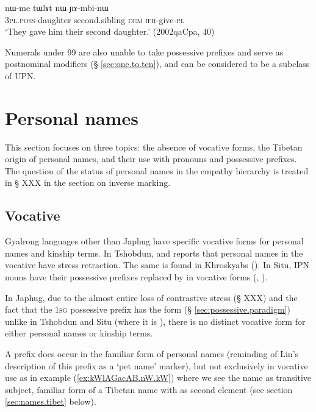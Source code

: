 \begin{exe}
\ex \label{ex:tWlAt}
\gll  nɯ-me tɯlɤt nɯ ɲɤ-mbi-nɯ \\
\textsc{3pl.poss}-daughter second.sibling \textsc{dem} \textsc{ifr}-give-\textsc{pl} \\
\glt `They gave him their second daughter.' (2002qaCpa, 40)
\end{exe} 

Numerals under 99 are also unable to take possessive prefixes and serve as postnominal modifiers (§ \ref{sec:one.to.ten}), and can be considered to be a subclass of UPN.

\section{Personal names}  \label{sec:personal.names}
This section focuses on three topics: the absence of vocative forms, the Tibetan origin of personal names, and their use with pronouns and possessive prefixes. The question of the status of personal names in the empathy hierarchy is treated in § XXX in the section on inverse marking.

\subsection{Vocative} \label{sec:vocative}
Gyalrong languages other than Japhug have specific vocative forms for personal names and kinship terms. In Tshobdun, \citet[133]{jackson98morphology} and \citet[53]{jackson05yingao} reports that personal names in the vocative have stress retraction. The same is found in Khroskyabs (\citealt[153]{lai17khroskyabs}). In Situ, IPN nouns have their possessive prefixes replaced by  in vocative forms (\citealt[471]{nagano03cogtse}, \citealt[177]{prins16kyomkyo}). 

In Japhug, due to the almost entire loss of contrastive stress (§ XXX) and the fact that the \textsc{1sg} possessive prefix has the form  (§ \ref{sec:possessive.paradigm}) unlike in Tshobdun and Situ (where it is ), there is no distinct vocative form for either personal names or kinship terms. 

A prefix  does occur in the familiar form of personal names (reminding of Lin's \citeyear[162]{linxr93jiarongen} description of this prefix as a  `pet name' marker), but not exclusively in vocative use as in example (\ref{ex:kWlAGacAB.nW.kW}) where we see the name  as transitive subject, familiar form of a Tibetan name with  as second element (see section \ref{sec:names.tibet} below).

